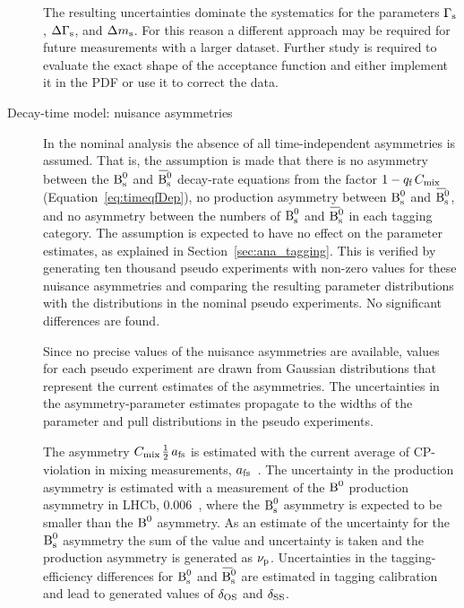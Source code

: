 \begin{description}
The resulting uncertainties dominate the systematics for the parameters $\Gs$, $\DGs$, and $\Dms$. For this reason a different approach may
be required for future measurements with a larger dataset. Further study is required to evaluate the exact shape of the acceptance function
and either implement it in the PDF or use it to correct the data.

\item[Decay-time model: nuisance \BsBsbar{} asymmetries]
In the nominal analysis the absence of all time-independent \BsBsbar{} asymmetries is assumed. That is, the assumption is made that there
is no asymmetry between the $\Bs$ and $\Bsbar$ decay-rate equations from the factor $1-\qf\,\Cm$ (Equation~\ref{eq:timeqfDep}), no
production asymmetry between $\Bs$ and $\Bsbar$, and no asymmetry between the numbers of $\Bs$ and $\Bsbar$ in each tagging category. The
assumption is expected to have no effect on the parameter estimates, as explained in Section~\ref{sec:ana_tagging}. This is verified by
generating ten thousand pseudo experiments with non-zero values for these nuisance asymmetries and comparing the resulting parameter
distributions with the distributions in the nominal pseudo experiments. No significant differences are found.

Since no precise values of the nuisance asymmetries are available, values for each pseudo experiment are drawn from Gaussian distributions
that represent the current estimates of the asymmetries. The uncertainties in the asymmetry-parameter estimates propagate to the widths of
the parameter and pull distributions in the pseudo experiments.

The asymmetry $\Cm$\textapprox$\tfrac{\text{1}}{\text{2}}\,\afs$ is estimated with the current average of CP-violation in mixing
measurements, $\afs$\texteq{}~\cite{Amhis:2012bh}. The uncertainty in the production asymmetry is estimated with a
measurement of the $\Bd$ production asymmetry in LHCb, 0.006~\cite{LHCb-PAPER-2013-040}, where the $\Bs$ asymmetry is expected
to be smaller than the $\Bd$ asymmetry. As an estimate of the uncertainty for the $\Bs$ asymmetry the sum of the value and uncertainty is
taken and the production asymmetry is generated as $\AProd$. Uncertainties in the tagging-efficiency differences for
$\Bs$ and $\Bsbar$ are estimated in tagging calibration~\cite{LHCb-ANA-2014-039} and lead to generated values of
$\ATagEff[\text{OS}]$ and $\ATagEff[\text{SS}]$.


\end{description}
